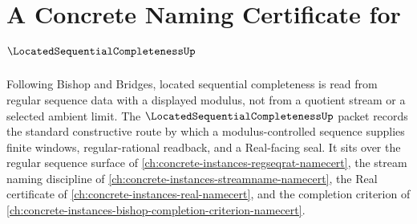 \chapter{A Concrete Naming Certificate for $\LocatedSequentialCompletenessUp$}
\label{ch:concrete-instances-located-sequential-completeness-namecert}

Following Bishop and Bridges, located sequential completeness is read from regular sequence data with a displayed modulus, not from a quotient stream or a selected ambient limit. The $\LocatedSequentialCompletenessUp$ packet records the standard constructive route by which a modulus-controlled sequence supplies finite windows, regular-rational readback, and a Real-facing seal. It sits over the regular sequence surface of \autoref{ch:concrete-instances-regseqrat-namecert}, the stream naming discipline of \autoref{ch:concrete-instances-streamname-namecert}, the Real certificate of \autoref{ch:concrete-instances-real-namecert}, and the completion criterion of \autoref{ch:concrete-instances-bishop-completion-criterion-namecert}.

